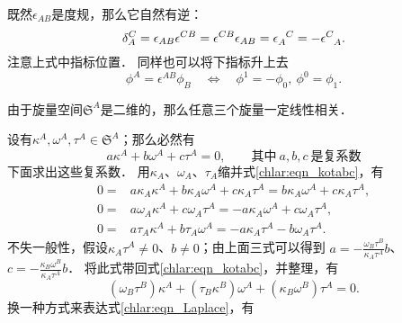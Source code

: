 既然$\epsilon_{AB}$是度规，那么它自然有逆：
\begin{equation}\label{chlar:eqn_smetric-inv}  
     \delta_A^C 
    =\epsilon_{AB} \epsilon^{CB} = \epsilon^{CB} \epsilon_{AB} 
    =\epsilon_A ^{\hphantom{A} C } =-\epsilon^C_{\hphantom{C}A}.
\end{equation}
注意上式中指标位置．
同样也可以将下指标升上去
\begin{equation}
    \phi^A = \epsilon^{AB} \phi_B \quad \Leftrightarrow \quad
    \phi^1 = -\phi_0 ,\ \phi^0 =\phi_1.
\end{equation}




\begin{example}
    由于旋量空间$\mathfrak{S}^A$是二维的，那么任意三个旋量一定线性相关．
\end{example}
设有$\kappa^A,\omega^A,\tau^A \in \mathfrak{S}^A$；那么必然有
\begin{equation}\label{chlar:eqn_kotabc}
    a \kappa^A + b\omega^A+c\tau^A =0,\qquad
    \text{其中}\ a,b,c\ \text{是复系数}
\end{equation}
下面求出这些复系数．
用$\kappa_A$、$\omega_A$、$\tau_A$缩并式\eqref{chlar:eqn_kotabc}，有
\begin{align*}
    0=& a \kappa_A\kappa^A + b \kappa_A \omega^A+c \kappa_A\tau^A = b \kappa_A \omega^A+c \kappa_A\tau^A ,\\
    0=& a \omega_A\kappa^A + c \omega_A\tau^A=-a \kappa_A\omega^A + c \omega_A\tau^A, \\
    0=& a \tau_A\kappa^A + b \tau_A\omega^A =-a \kappa_A \tau^A - b \omega_A \tau^A. 
\end{align*}
不失一般性，假设$\kappa_A \tau^A\neq 0$、$b\neq 0$；由上面三式可以得到
$a=-\frac{\omega_B \tau^B }{\kappa_A \tau^A}b$、
$c=-\frac{\kappa_B \omega^B }{\kappa_A \tau^A}b$．
将此式带回式\eqref{chlar:eqn_kotabc}，并整理，有
\begin{equation}\label{chlar:eqn_Laplace}
    (\omega_B \tau^B ) \kappa^A + (\tau_B \kappa^B ) \omega^A +(\kappa_B \omega^B ) \tau^A =0 .
\end{equation}
换一种方式来表达式\eqref{chlar:eqn_Laplace}，有
